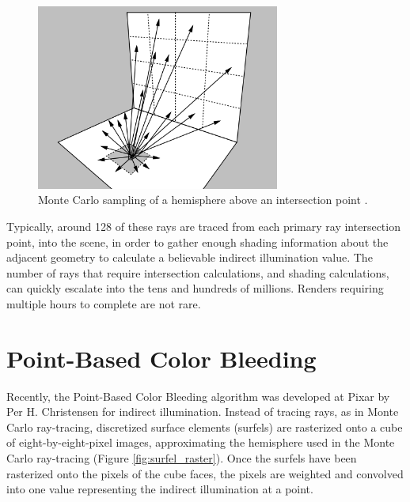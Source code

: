 \begin{figure}[h]
   \centering
   \includegraphics[width=80mm]{../img/shirley_monte_carlo.png}
   \captionfonts
   \caption[Monte Carlo hemisphere]{Monte Carlo sampling of a hemisphere above an intersection point \cite{bib:shirley1991}.}
   \label{fig:monte_carlo}
\end{figure}

Typically, around 128 of these rays are traced from each primary ray intersection point, into the scene, in order to gather enough shading information about the adjacent geometry to calculate a believable indirect illumination value. The number of rays that require intersection calculations, and shading calculations, can quickly escalate into the tens and hundreds of millions. Renders requiring multiple hours to complete are not rare.

\section{Point-Based Color Bleeding}
Recently, the Point-Based Color Bleeding algorithm was developed at Pixar by Per H. Christensen \cite{bib:christensen2008} for indirect illumination. Instead of tracing rays, as in Monte Carlo ray-tracing, discretized surface elements (surfels) are rasterized onto a cube of eight-by-eight-pixel images, approximating the hemisphere used in the Monte Carlo ray-tracing (Figure \ref{fig:surfel_raster}). Once the surfels have been rasterized onto the pixels of the cube faces, the pixels are weighted and convolved into one value representing the indirect illumination at a point.

